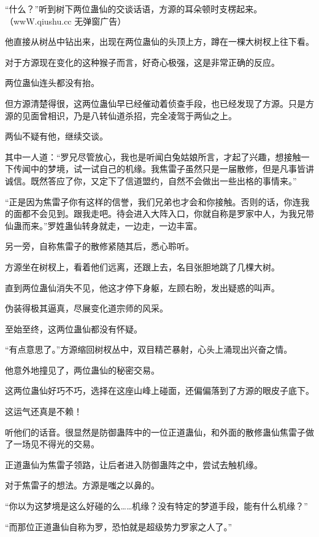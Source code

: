 
\begin{this_body}

“什么？”听到树下两位蛊仙的交谈话语，方源的耳朵顿时支楞起来。（wwW.qiushu.cc 无弹窗广告）

他直接从树丛中钻出来，出现在两位蛊仙的头顶上方，蹲在一棵大树杈上往下看。

对于方源现在变化的这种猴子而言，好奇心极强，这是非常正确的反应。

两位蛊仙连头都没有抬。

但方源清楚得很，这两位蛊仙早已经催动着侦查手段，也已经发现了方源。只是方源的见面曾相识，乃是八转仙道杀招，完全凌驾于两仙之上。

两仙不疑有他，继续交谈。

其中一人道：“罗兄尽管放心，我也是听闻白兔姑娘所言，才起了兴趣，想接触一下传闻中的梦境，试一试自己的机缘。我焦雷子虽然只是一届散修，但是凡事皆讲诚信。既然答应了你，又定下了信道盟约，自然不会做出一些出格的事情来。”

“正是因为焦雷子你有这样的信誉，我们兄弟也才会和你接触。否则的话，你连我的面都不会见到。跟我走吧。待会进入大阵入口，你就自称是罗家中人，为我兄带仙蛊而来。”罗姓蛊仙转身就走，一边走，一边丰富。

另一旁，自称焦雷子的散修紧随其后，悉心聆听。

方源坐在树杈上，看着他们远离，还跟上去，名目张胆地跳了几棵大树。

直到两位蛊仙消失不见，他这才停下身躯，左顾右盼，发出疑惑的叫声。

伪装得极其逼真，尽展变化道宗师的风采。

至始至终，这两位蛊仙都没有怀疑。

“有点意思了。”方源缩回树杈丛中，双目精芒暴射，心头上涌现出兴奋之情。

他意外地撞见了，两位蛊仙的秘密交易。

这两位蛊仙好巧不巧，选择在这座山峰上碰面，还偏偏落到了方源的眼皮子底下。

这运气还真是不赖！

听他们的话音。很显然是防御蛊阵中的一位正道蛊仙，和外面的散修蛊仙焦雷子做了一场见不得光的交易。

正道蛊仙为焦雷子领路，让后者进入防御蛊阵之中，尝试去触机缘。

对于焦雷子的想法。方源是嗤之以鼻的。

“你以为这梦境是这么好碰的么……机缘？没有特定的梦道手段，能有什么机缘？”

“而那位正道蛊仙自称为罗，恐怕就是超级势力罗家之人了。”


\end{this_body}
